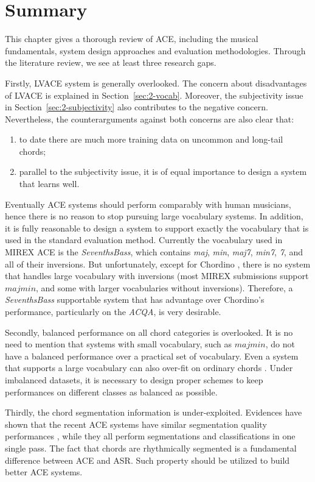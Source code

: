 \section{Summary} \label{sec:2-summary}
This chapter gives a thorough review of ACE, including the musical fundamentals, system design approaches and evaluation methodologies. Through the literature review, we see at least three research gaps.

Firstly, LVACE system is generally overlooked. The concern about disadvantages of LVACE is explained in Section~\ref{sec:2-vocab}. Moreover, the subjectivity issue in Section~\ref{sec:2-subjectivity} also contributes to the negative concern. Nevertheless, the counterarguments against both concerns are also clear that:
\begin{enumerate}
\item to date there are much more training data on uncommon and long-tail chords;
\item parallel to the subjectivity issue, it is of equal importance to design a system that learns well.
\end{enumerate}
Eventually ACE systems should perform comparably with human musicians, hence there is no reason to stop pursuing large vocabulary systems. In addition, it is fully reasonable to design a system to support exactly the vocabulary that is used in the standard evaluation method. Currently the vocabulary used in MIREX ACE is the \textit{SeventhsBass}, which contains \textit{maj}, \textit{min}, \textit{maj7}, \textit{min7}, \textit{7}, and all of their inversions. But unfortunately, except for Chordino \cite{cannam2010sonic}, there is no system that handles large vocabulary with inversions (most MIREX submissions support $majmin$, and some with larger vocabularies without inversions). Therefore, a \textit{SeventhsBass} supportable system that has advantage over Chordino's performance, particularly on the \textit{ACQA}, is very desirable.

Secondly, balanced performance on all chord categories is overlooked. It is no need to mention that systems with small vocabulary, such as $majmin$, do not have a balanced performance over a practical set of vocabulary. Even a system that supports a large vocabulary can also over-fit on ordinary chords \cite{deng2016hybrid}. Under imbalanced datasets, it is necessary to design proper schemes to keep performances on different classes as balanced as possible.

Thirdly, the chord segmentation information is under-exploited. Evidences have shown that the recent ACE systems have similar segmentation quality performances \cite{burgoyne2014comparative}, while they all perform segmentations and classifications in one single pass. The fact that chords are rhythmically segmented is a fundamental difference between ACE and ASR. Such property should be utilized to build better ACE systems.

